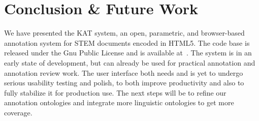 \section{Conclusion \& Future Work}

We have presented the KAT system, an open, parametric, and browser-based annotation system for STEM documents encoded in HTML5. The code base is released under the Gnu Public License and is available at~\cite{KAT:github:on}. The system is in an early state of development, but can already be used for practical annotation and annotation review work. The user interface both needs and is yet to undergo serious usability testing and polish, to both improve productivity and also to fully stabilize it for production use. The next steps will be to refine our annotation ontologies and integrate more linguistic ontologies to get more coverage.
